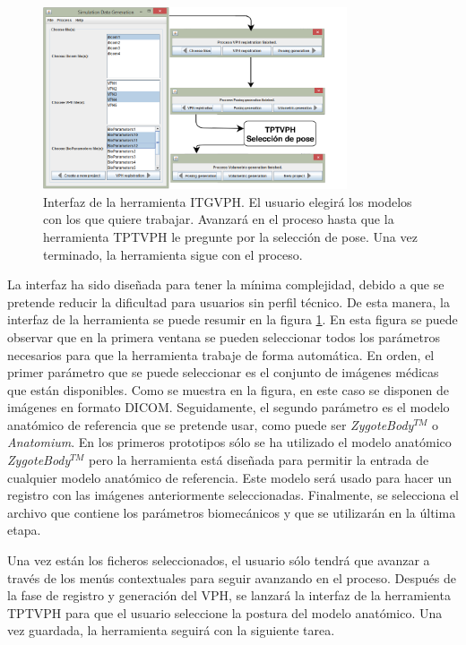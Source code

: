 \begin{figure}[htbp]
    \centering
    \includegraphics[width=0.8\textwidth]{IMG/toolkitui.png}
    \caption{Interfaz de la herramienta \acs{ITGVPH}. El usuario elegirá los modelos con los que quiere trabajar. Avanzará en el proceso hasta que la herramienta \acs{TPTVPH} le pregunte por la selección de pose. Una vez terminado, la herramienta sigue con el proceso.}
    \label{fig:toolui}
\end{figure}


La interfaz ha sido diseñada para tener la mínima complejidad, debido a que se pretende reducir la dificultad para usuarios sin perfil técnico. De esta manera, la interfaz de la herramienta se puede resumir en la figura \ref{fig:toolui}. En esta figura se puede observar que en la primera ventana se pueden seleccionar todos los parámetros necesarios para que la herramienta trabaje de forma automática.
En orden, el primer parámetro que se puede seleccionar es el conjunto de imágenes médicas que están disponibles. Como se muestra en la figura, en este caso se disponen de imágenes en formato \acs{DICOM}.
Seguidamente, el segundo parámetro es el modelo anatómico de referencia que se pretende usar, como puede ser \emph{ZygoteBody}$^{TM}$ o \emph{Anatomium}. En los primeros prototipos sólo se ha utilizado el modelo anatómico \emph{ZygoteBody}$^{TM}$ pero la herramienta está diseñada para permitir la entrada de cualquier modelo anatómico de referencia. Este modelo será usado para hacer un registro con las imágenes anteriormente seleccionadas. 
Finalmente, se selecciona el archivo que contiene los parámetros biomecánicos y que se utilizarán en la última etapa.



Una vez están los ficheros seleccionados, el usuario sólo tendrá que avanzar a través de los menús contextuales para seguir avanzando en el proceso. Después de la fase de registro y generación del \ac{VPH}, se lanzará la interfaz de la herramienta \ac{TPTVPH} para que el usuario seleccione la postura del modelo anatómico. Una vez guardada, la herramienta seguirá con la siguiente tarea.


